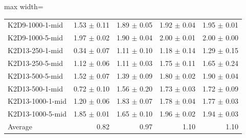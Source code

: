 \documentclass{article}
\begin{document}
\begin{table}[ht]
\begin{center}
\begin{small}
\begin{adjustbox}{max width=\columnwidth}
\begin{tabular}{l|rrrr}
K2D9-1000-1-mid & 1.53 $\pm$ 0.11 & 1.89 $\pm$ 0.05 & 1.92 $\pm$ 0.04 & 1.95 $\pm$ 0.01\\
K2D9-1000-5-mid & 1.97 $\pm$ 0.02 & 1.90 $\pm$ 0.04 & 2.00 $\pm$ 0.01 & 2.00 $\pm$ 0.00\\
K2D13-250-1-mid & 0.34 $\pm$ 0.07 & 1.11 $\pm$ 0.10 & 1.18 $\pm$ 0.14 & 1.29 $\pm$ 0.15\\
K2D13-250-5-mid & 1.12 $\pm$ 0.06 & 1.11 $\pm$ 0.03 & 1.75 $\pm$ 0.11 & 1.65 $\pm$ 0.24\\
K2D13-500-5-mid & 1.52 $\pm$ 0.07 & 1.39 $\pm$ 0.09 & 1.80 $\pm$ 0.02 & 1.90 $\pm$ 0.04\\
K2D13-500-1-mid & 0.72 $\pm$ 0.10 & 1.56 $\pm$ 0.20 & 1.73 $\pm$ 0.03 & 1.72 $\pm$ 0.09\\
K2D13-1000-1-mid & 1.20 $\pm$ 0.06 & 1.83 $\pm$ 0.07 & 1.78 $\pm$ 0.04 & 1.77 $\pm$ 0.03\\
K2D13-1000-5-mid & 1.85 $\pm$ 0.01 & 1.65 $\pm$ 0.10 & 1.96 $\pm$ 0.02 & 1.94 $\pm$ 0.03\\
\midrule
Average & 0.82 & 0.97 & 1.10 & 1.10\\
\end{tabular}
        \end{adjustbox}
    \end{small}
    \end{center}
    \vskip -0.1in
\end{table}
\end{document}
